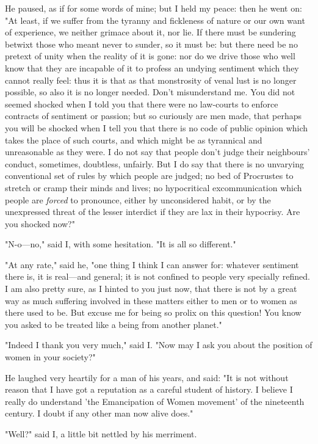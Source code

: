 He paused, as if for some words of mine; but I held my peace: then he
went on: "At least, if we suffer from the tyranny and fickleness of
nature or our own want of experience, we neither grimace about it, nor
lie. If there must be sundering betwixt those who meant never to sunder,
so it must be: but there need be no pretext of unity when the reality of
it is gone: nor do we drive those who well know that they are incapable
of it to profess an undying sentiment which they cannot really feel:
thus it is that as that monstrosity of venal lust is no longer possible,
so also it is no longer needed. Don't misunderstand me. You did not
seemed shocked when I told you that there were no law-courts to enforce
contracts of sentiment or passion; but so curiously are men made, that
perhaps you will be shocked when I tell you that there is no code of
public opinion which takes the place of such courts, and which might be
as tyrannical and unreasonable as they were. I do not say that people
don't judge their neighbours' conduct, sometimes, doubtless, unfairly.
But I do say that there is no unvarying conventional set of rules by
which people are judged; no bed of Procrustes to stretch or cramp their
minds and lives; no hypocritical excommunication which people are
\emph{forced} to pronounce, either by unconsidered habit, or by the
unexpressed threat of the lesser interdict if they are lax in their
hypocrisy. Are you shocked now?"

"N-o---no," said I, with some hesitation. "It is all so different."

"At any rate," said he, "one thing I think I can answer for: whatever
sentiment there is, it is real---and general; it is not confined to
people very specially refined. I am also pretty sure, as I hinted to you
just now, that there is not by a great way as much suffering involved in
these matters either to men or to women as there used to be. But excuse
me for being so prolix on this question! You know you asked to be
treated like a being from another planet."

"Indeed I thank you very much," said I. "Now may I ask you about the
position of women in your society?"

He laughed very heartily for a man of his years, and said: "It is not
without reason that I have got a reputation as a careful student of
history. I believe I really do understand 'the Emancipation of Women
movement' of the nineteenth century. I doubt if any other man now alive
does."

"Well?" said I, a little bit nettled by his merriment.

